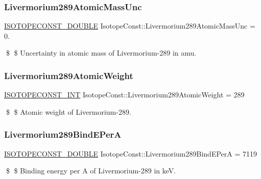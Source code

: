 \subsubsection{\texorpdfstring{Livermorium289\+Atomic\+Mass\+Unc}{Livermorium289AtomicMassUnc}}
{\footnotesize\ttfamily \mbox{\hyperlink{group___isotope_const-_macros_ga8f45a7272ce02c0b4c65c44636ed719a}{I\+S\+O\+T\+O\+P\+E\+C\+O\+N\+S\+T\+\_\+\+D\+O\+U\+B\+LE}} Isotope\+Const\+::\+Livermorium289\+Atomic\+Mass\+Unc = 0.}

\$ \$ Uncertainty in atomic mass of Livermorium-\/289 in amu. \mbox{\label{group___isotope_const-_livermorium-_lv289_gabfb5e10cd6de7ff74fab496bb41d8f66}} 
\subsubsection{\texorpdfstring{Livermorium289\+Atomic\+Weight}{Livermorium289AtomicWeight}}
{\footnotesize\ttfamily \mbox{\hyperlink{group___isotope_const-_macros_ga5f18360b3e99483a35c32d789e62621c}{I\+S\+O\+T\+O\+P\+E\+C\+O\+N\+S\+T\+\_\+\+I\+NT}} Isotope\+Const\+::\+Livermorium289\+Atomic\+Weight = 289}

\$ \$ Atomic weight of Livermorium-\/289. \mbox{\label{group___isotope_const-_livermorium-_lv289_ga54b11fc087bd5f08887d5e1116260ed8}} 
\subsubsection{\texorpdfstring{Livermorium289\+Bind\+E\+PerA}{Livermorium289BindEPerA}}
{\footnotesize\ttfamily \mbox{\hyperlink{group___isotope_const-_macros_ga8f45a7272ce02c0b4c65c44636ed719a}{I\+S\+O\+T\+O\+P\+E\+C\+O\+N\+S\+T\+\_\+\+D\+O\+U\+B\+LE}} Isotope\+Const\+::\+Livermorium289\+Bind\+E\+PerA = 7119}

\$ \$ Binding energy per A of Livermorium-\/289 in keV. \mbox{\label{group___isotope_const-_livermorium-_lv289_gaa677bc188c035b832e47f1d70b0d6c66}} 
